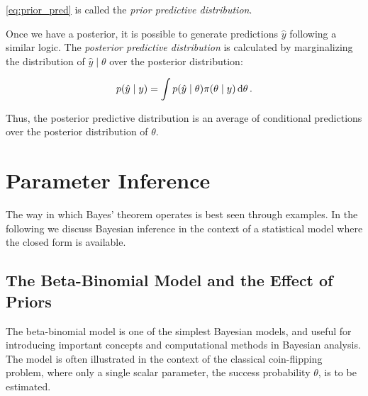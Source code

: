 \autoref{eq:prior_pred} is called the \textit{prior predictive distribution}. 

Once we have a posterior, it is possible to generate predictions $\hat{y}$ following a similar logic. The \textit{posterior predictive distribution} is calculated by marginalizing the distribution of $\hat{y} \mid \theta$ over the posterior distribution: 

\begin{equation}\label{eq:post_pred}
    p \qty( \hat{y} \mid y ) =\int p \qty(\hat{y} \mid \theta) \pi \qty(\theta \mid y) \dd{\theta}.
\end{equation} 

Thus, the posterior predictive distribution is an average of conditional predictions over the posterior distribution of $\theta$.


\section{Parameter Inference}\label{sec:param_inference}

The way in which Bayes' theorem operates is best seen through examples. In the following we discuss Bayesian inference in the context of a statistical model where the closed form is available. %

\subsection{The Beta-Binomial Model and the Effect of Priors}\label{sec:coin_flipping}

The beta-binomial model is one of the simplest Bayesian models, and useful for introducing important concepts and computational methods in Bayesian analysis. The model is often illustrated in the context of the classical coin-flipping problem, where only a single scalar parameter, the success probability $\theta$, is to be estimated. 

